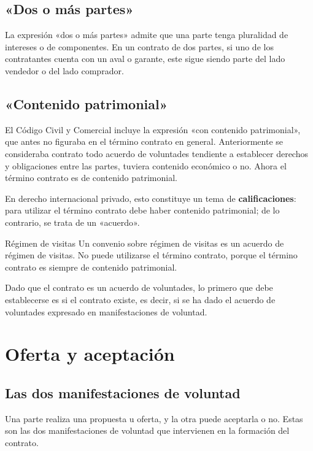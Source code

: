 \documentclass[12pt,oneside]{book}
\begin{document}
\subsection{«Dos o más partes»}

La expresión «dos o más partes» admite que una parte tenga pluralidad de intereses o de componentes. En un contrato de dos partes, si uno de los contratantes cuenta con un aval o garante, este sigue siendo parte del lado vendedor o del lado comprador.

\subsection{«Contenido patrimonial»}

El Código Civil y Comercial incluye la expresión «con contenido patrimonial», que antes no figuraba en el término contrato en general. Anteriormente se consideraba contrato todo acuerdo de voluntades tendiente a establecer derechos y obligaciones entre las partes, tuviera contenido económico o no. Ahora el término contrato es de contenido patrimonial.

En derecho internacional privado, esto constituye un tema de \textbf{calificaciones}: para utilizar el término contrato debe haber contenido patrimonial; de lo contrario, se trata de un «acuerdo».

\begin{example}{Régimen de visitas}
Un convenio sobre régimen de visitas es un acuerdo de régimen de visitas. No puede utilizarse el término contrato, porque el término contrato es siempre de contenido patrimonial.
\end{example}

Dado que el contrato es un acuerdo de voluntades, lo primero que debe establecerse es si el contrato existe, es decir, si se ha dado el acuerdo de voluntades expresado en manifestaciones de voluntad.

\section{Oferta y aceptación}

\subsection{Las dos manifestaciones de voluntad}

Una parte realiza una propuesta u oferta, y la otra puede aceptarla o no. Estas son las dos manifestaciones de voluntad que intervienen en la formación del contrato.
\end{document}
